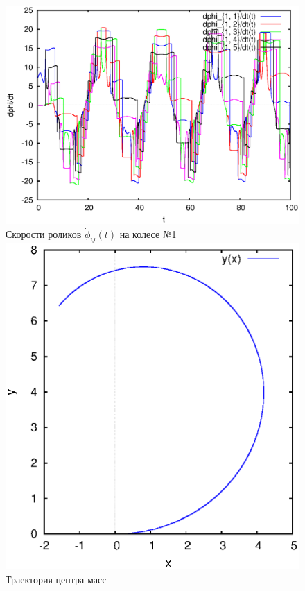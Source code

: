 \begin{figure}[H]
    \begin{columns}
            \centering
            \includegraphics[width=\linewidth]{pic/rol__wrench__velocities_of_rollers_of_wheel_1}\\
            Скорости роликов $\dot{\phi}_{ij}(t)$ на колесе №1
            \centering
            \includegraphics[width=\linewidth]{pic/rol__wrench__trajectory}\\
            Траектория центра масс
    \end{columns}

\end{figure}
